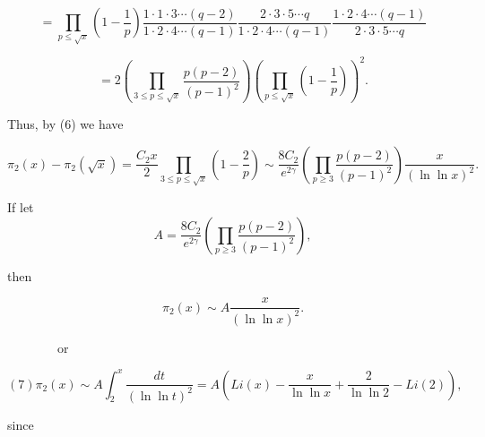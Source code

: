 \documentclass{article}
\begin{document}
\vspace{1\baselineskip}
\begin{equation}
  =  \prod_{p\leq\sqrt{x}}^{}(1-\frac{1}{p} )  \frac{1\cdot 1\cdot 3\cdots (q-2)}{1\cdot 2\cdot 4\cdots (q-1)}   \frac{2\cdot 3\cdot 5\cdots q}{1\cdot 2\cdot 4\cdots (q-1)} \frac{1\cdot 2\cdot 4\cdots (q-1)}{2\cdot 3\cdot 5\cdots q} 
\end{equation}


\begin{equation}
 = 2\left(\prod_{3\leq p\leq\sqrt{x}}^{}\frac{p(p-2)}{(p-1)^{2}}\right)\left(\prod_{p\leq\sqrt{x}}^{}(1-\frac{1}{p} )\right)^{2} .
\end{equation}

\vspace{1\baselineskip}

 Thus, by (6) we have

\begin{equation}
\pi_{2}\left(x\right)-\pi_{2}\left(\sqrt{x}\right)  = \frac{C_{2}x}{2} \prod_{3\leq p\leq\sqrt{x}}^{}\left(1-\frac{2}{p}\right) \sim \frac{8C_{2}}{e^{2\gamma }}\left(\prod_{p\geq 3}^{}\frac{p\left(p-2\right)}{\left(p-1\right)^{2}}\right)\frac{x}{(\ln \ln  x)^{2}} .
\end{equation}


\begin{center}
If let \textit{ \\ }\begin{equation}
A = \frac{8C_{2}}{e^{2\gamma }}\left(\prod_{p\geq 3}^{}\frac{p\left(p-2\right)}{\left(p-1\right)^{2}}\right)  ,
\end{equation}

\end{center}


then

\begin{equation}
                                                 \pi_{2}\left(x\right) \sim  A\frac{x}{(\ln \ln  x)^{2}} .                                                
\end{equation}


\ \ \ \ \ \ \ \ or

\begin{equation}
\left(7\right)                             \pi_{2}\left(x\right) \sim  A \int_{2}^{x}\frac{dt}{(\ln \ln  t)^{2}}  = A\left(Li\left(x\right)-\frac{x}{\ln \ln  x }+\frac{2}{\ln \ln  2 }-Li\left(2\right)\right) ,        
\end{equation}


since 
\end{document}
